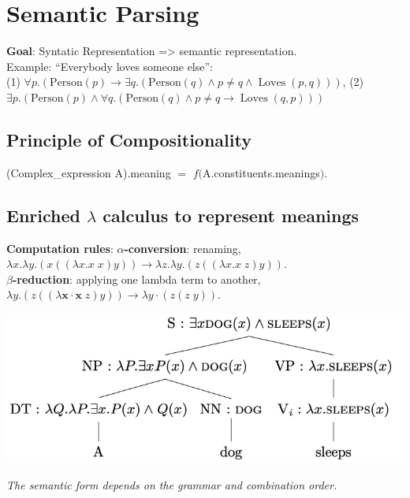 \section{Semantic Parsing}

\textbf{Goal}: Syntatic Representation => semantic representation. \\ Example: “Everybody loves someone else”: \\ (1) $ \forall p .(\mathrm{Person}(p) \rightarrow \exists q .(\mathrm{Person}(q) \wedge p \neq q \wedge \operatorname{Loves}(p, q)))$, \quad (2) $ \exists p .(\mathrm{Person}(p) \wedge \forall q .(\mathrm{Person}(q) \wedge p \neq q \rightarrow \operatorname{Loves}(q, p)))$

\subsection*{Principle of Compositionality}
(Complex\_expression A).meaning $=$ $f($A.constituents.meanings$)$.

\subsection*{Enriched $\lambda$ calculus to represent meanings}
\textbf{Computation rules}: $\alpha$\textbf{-conversion}: renaming, \\
$\lambda x . \lambda y .(x((\lambda x . x \; x) y)) \rightarrow \lambda z . \lambda y .(z((\lambda x . x \; z) y))$. \\
$\beta$\textbf{-reduction}: applying one lambda term to another, $\lambda y .(z((\lambda \mathbf{x} \cdot \mathbf{x} \; z) y)) \rightarrow \lambda y \cdot(z(z \;y))$.
\vspace{-0.4cm}
\begin{center}
    \includegraphics[width=\columnwidth]{img/semantic_representation.png}
\end{center}
\vspace{-0.5cm}
\textit{The semantic form depends on the grammar and combination order.} 

